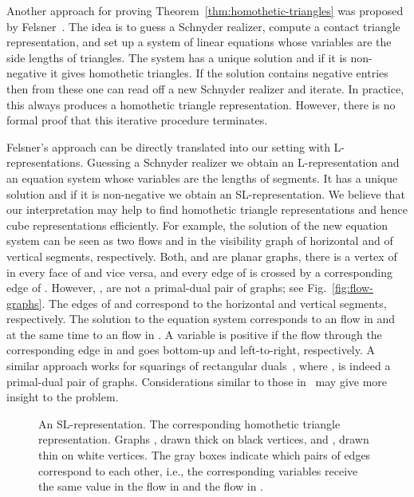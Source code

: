 \documentclass{llncs}
\begin{document}
Another approach for proving Theorem~\ref{thm:homothetic-triangles} was proposed by Felsner~\cite{Felsner11}. The idea is to guess a Schnyder realizer, compute a contact triangle representation, and set up a system of linear equations whose variables are the side lengths of triangles. The system has a unique solution and if it is non-negative it gives homothetic triangles. If the solution contains negative entries then from these one can read off a new Schnyder realizer and iterate. In practice, this always produces a homothetic triangle representation. However, there is no formal proof that this iterative procedure terminates.

Felsner's approach can be directly translated into our setting with L-representations. Guessing a Schnyder realizer we obtain an L-representation and an equation system whose variables are the lengths of segments. It has a unique solution and if it is non-negative we obtain an SL-representation. We believe that our interpretation may help to find homothetic triangle representations and hence cube representations efficiently. For example, the solution of the new equation system can be seen as two flows  and  in the visibility graph  of horizontal and  of vertical segments, respectively. Both,  and  are planar graphs, there is a vertex of  in every face of  and vice versa, and every edge of  is crossed by a corresponding edge of . However, ,  are not a primal-dual pair of graphs; see Fig.~\ref{fig:flow-graphs}. The edges of  and  correspond to the horizontal and vertical segments, respectively. The solution to the equation system corresponds to an  flow in  and at the same time to an  flow in . A variable is positive if the flow through the corresponding edge in  and  goes bottom-up and left-to-right, respectively. A similar approach works for squarings of rectangular duals~\cite{FelsnerSurvey}, where ,  is indeed a primal-dual pair of graphs. Considerations similar to those in~\cite{FelsnerSurvey} may give more insight to the problem.


 \begin{figure}[t!]
\centering
  \caption{ An SL-representation.  The corresponding homothetic triangle representation.  Graphs , drawn thick on black vertices, and , drawn thin on white vertices.
The gray boxes indicate which pairs of edges correspond to each other, i.e., the corresponding variables receive the same value in the  flow in  and the  flow in .}
  \label{fig:overconstrained}
 \end{figure}
 
\end{document}
